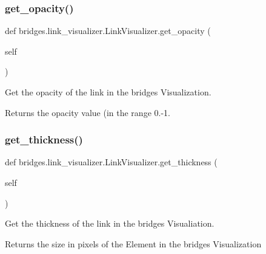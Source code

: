 \subsubsection{\texorpdfstring{get\+\_\+opacity()}{get\_opacity()}}
{\footnotesize\ttfamily def bridges.\+link\+\_\+visualizer.\+Link\+Visualizer.\+get\+\_\+opacity (\begin{DoxyParamCaption}\item[{}]{self }\end{DoxyParamCaption})}



Get the opacity of the link in the bridges Visualization. 

\begin{DoxyReturn}{Returns}
the opacity value (in the range 0.-\/1. 
\end{DoxyReturn}
\mbox{\label{classbridges_1_1link__visualizer_1_1_link_visualizer_af8975a958ec0783e8cf8cca75cbea962}} 
\subsubsection{\texorpdfstring{get\+\_\+thickness()}{get\_thickness()}}
{\footnotesize\ttfamily def bridges.\+link\+\_\+visualizer.\+Link\+Visualizer.\+get\+\_\+thickness (\begin{DoxyParamCaption}\item[{}]{self }\end{DoxyParamCaption})}



Get the thickness of the link in the bridges Visualiation. 

\begin{DoxyReturn}{Returns}
the size in pixels of the Element in the bridges Visualization 
\end{DoxyReturn}
\mbox{\label{classbridges_1_1link__visualizer_1_1_link_visualizer_a7e0e6e1482cd37f66c8c0329fd74d4af}} 
